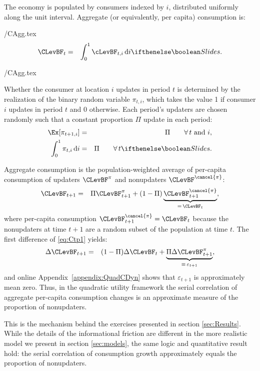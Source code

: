 \documentclass[titlepage]{\econtex}
\begin{document}
The economy is populated by consumers indexed by $i$, distributed uniformly along the unit interval.  Aggregate (or equivalently, per capita) consumption is:
\begin{verbatimwrite}{\eq/CAgg.tex}
\begin{eqnarray*}
        \CLevBF_{t} & = & \int_{0}^{1} \cLevBF_{t,i}\,\text{d}i
\ifslides{}{.}
\end{eqnarray*}
\end{verbatimwrite}
 \eq/CAgg.tex

Whether the consumer at location $i$ updates in period $t$ is determined by the realization of the binary random variable $\pi_{t,i}$, which takes the value 1 if consumer $i$ updates in period $t$ and 0 otherwise.  Each period's updaters are chosen randomly such that a constant proportion $\Pi$ update in each period:
\begin{eqnarray*}
   \Ex[\pi_{t+1,i}] &= & \Pi \qquad \forall\,t \text{ and } i,
\\ \int_{0}^{1} \pi_{t,i}\,\text{d}i & = & \Pi \qquad \forall\,t
\ifslides{}{.}
\end{eqnarray*}

Aggregate consumption is the population-weighted average of per-capita consumption of updaters $\CLevBF^{\pi}$ and nonupdaters $\CLevBF^{\cancel{\pi}}$:
\begin{eqnarray}
 \CLevBF_{t+1} & = & \Pi \CLevBF^{{\pi}}_{t+1}+(1-\Pi) \underbrace{\CLevBF^{\cancel{{\pi}}}_{t+1}}_{=\,\CLevBF_{t}}, \label{eq:Ctp1}
\end{eqnarray}
where per-capita consumption $\CLevBF^{\cancel{{\pi}}}_{t+1}=\CLevBF_{t}$ because the
nonupdaters at time $t+1$ are a random subset of the population at time $t$.
The first difference of \eqref{eq:Ctp1} yields:
\begin{eqnarray*}
  \Delta \CLevBF_{t+1} & = &  (1-\Pi) \Delta \CLevBF_{t} + \underbrace{\Pi \Delta \CLevBF^{{\pi}}_{t+1}}_{\equiv\,\varepsilon_{t+1}}, \label{eq:deltac} \label{eq:dCQuadStickyApprox}
\end{eqnarray*}
and online Appendix~\ref{appendix:QuadCDyn} shows that $\varepsilon_{t+1}$ is approximately mean zero. Thus, in the quadratic utility framework the serial correlation of aggregate per-capita consumption changes is an approximate measure of the proportion of nonupdaters.

This is the mechanism behind the exercises presented in section \ref{sec:Results}.  While the details of the informational friction are different in the more realistic model we present in section \ref{sec:models}, the same logic and quantitative result hold: the serial correlation of consumption growth approximately equals the proportion of nonupdaters.
\end{document}
